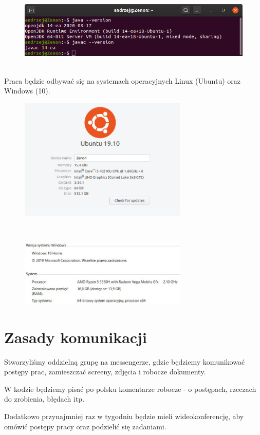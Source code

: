 \documentclass{article}
\begin{document}
\clearpage

\begin{figure} [hbt!]
    \includegraphics[width=13cm, center]{img/ac_java_ubuntu.png}
\end{figure}\\

Praca będzie odbywać się na systemach operacyjnych Linux (Ubuntu) oraz Windows (10).

\begin{figure} [hbt!]
    \includegraphics[width= 8cm, center]{img/Wersja_SO.jpg}
\end{figure}\\
\begin{figure} [hbt!]
    \includegraphics[width= 8cm, center]{img/zb_Windows10.JPG}
\end{figure}
\clearpage

\section{Zasady komunikacji}

\par Stworzyliśmy oddzielną grupę na messengerze, gdzie będziemy komunikować postępy prac, zamieszczać screeny, zdjęcia i robocze dokumenty.
\par W kodzie będziemy pisać po polsku komentarze robocze - o postępach, rzeczach do zrobienia, błędach itp. 
\par Dodatkowo przynajmniej raz w tygodniu będzie mieli wideokonferencję, aby omówić postępy pracy oraz podzielić się zadaniami.
\end{document}
